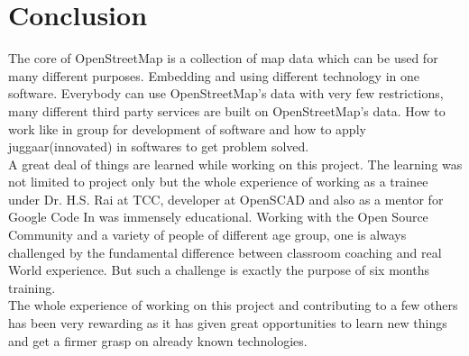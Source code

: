 \section{Conclusion}
The core of OpenStreetMap is a collection of map data which can be used for many different purposes. Embedding and using different technology in one software. Everybody can use OpenStreetMap's data with very few restrictions, many different third party services are built on OpenStreetMap's data. How to work like in group for development of software and how to apply juggaar(innovated) in softwares to get problem solved.\\
A great deal of things are learned while working on this project. The learning was not
limited to project only but the whole experience of working as a trainee under Dr. H.S. Rai
at TCC, developer at OpenSCAD and also as a mentor for Google Code In was immensely
educational. Working with the Open Source Community and a variety of people of different
age group, one is always challenged by the fundamental difference between classroom coaching
and real World experience. But such a challenge is exactly the purpose of six months training.\\
The whole experience of working on this project and contributing to a few others has been
very rewarding as it has given great opportunities to learn new things and get a firmer grasp on
already known technologies.\\

